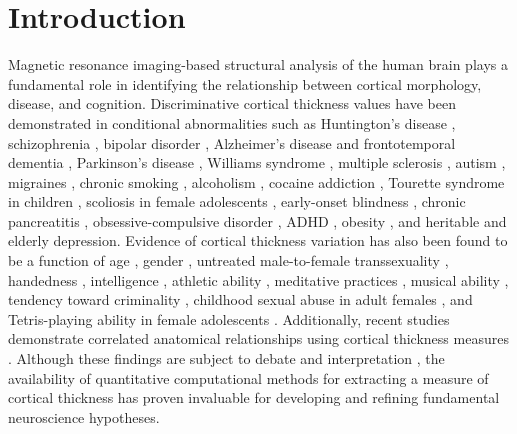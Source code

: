 \section{Introduction}

Magnetic resonance imaging-based 
structural analysis of the human brain plays a fundamental role
in identifying the relationship between cortical morphology, disease, and cognition.
Discriminative cortical thickness values 
have been demonstrated in conditional abnormalities such as
Huntington's disease \citep{rosas2002,rosas2005,selemon2004}, 
schizophrenia \citep{nesvag2008}, bipolar disorder \cite{lyoo2006}, Alzheimer's disease and frontotemporal
dementia \citep{du2007,dickerson2009}, Parkinson's disease \citep{jubault2011}, Williams syndrome \citep{thompson2005},
multiple sclerosis \citep{ramasamy2009}, autism \citep{chung2005,hardan2006},
migraines \citep{dasilva2007}, chronic smoking \citep{kuhn2010}, alcoholism \citep{fortier2011},
cocaine addiction \citep{makris2008}, Tourette syndrome in children \citep{sowell2008},
scoliosis in
female adolescents \citep{wang2012}, 
early-onset blindness \citep{jiang2009},
chronic pancreatitis \citep{frokjaer2012},
obsessive-compulsive disorder \citep{shin2007}, ADHD \citep{almeida-montes2012}, obesity \citep{raji2010}, 
and heritable \citep{peterson2009}
and elderly \citep{ballmaier2004} depression.  Evidence of cortical thickness 
variation has also been found to be a function of age \citep{kochunov2011},
gender \citep{luders2006a}, untreated
male-to-female transsexuality \citep{luders2012},  handedness
\citep{luders2006,amunts2007}, intelligence \citep{shaw2006}, athletic
ability \citep{wei2011}, meditative practices \cite{lazar2005}, musical ability \citep{bermudez2009,foster2010}, 
tendency toward criminality \citep{raine2011}, 
childhood sexual abuse in adult females \citep{heim2013},
and Tetris-playing
ability in female adolescents \citep{haier2009}.  Additionally,
recent studies demonstrate correlated anatomical
relationships using cortical thickness measures
\citep{worsley2005,lerch2006,he2007,chen2008}.
Although these findings
are subject to debate and interpretation \citep{gernsbacher2007}, 
the availability of quantitative
computational methods for extracting a measure of cortical thickness
has proven invaluable for developing and refining fundamental 
neuroscience hypotheses.

